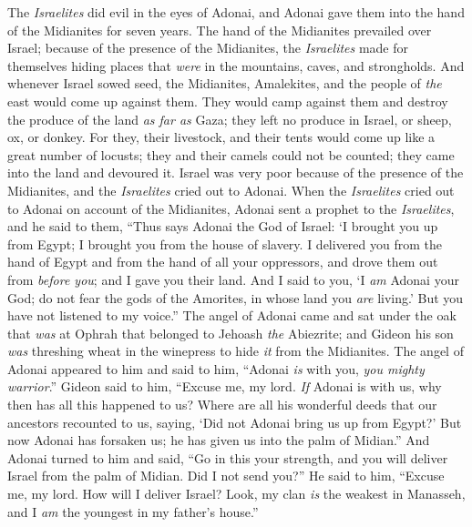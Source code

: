 \begin{biblechapter} %
 The \textit{Israelites} did evil in the eyes of Adonai, and Adonai gave them into the hand of the Midianites for seven years.
\verse The hand of the Midianites prevailed over Israel; because of the presence of the Midianites, the \textit{Israelites} made for themselves hiding places that \textit{were} in the mountains, caves, and strongholds.
\verse And whenever Israel sowed seed, the Midianites, Amalekites, and the people of \textit{the} east would come up against them.
\verse They would camp against them and destroy the produce of the land \textit{as far as} Gaza; they left no produce in Israel, or sheep, ox, or donkey.
\verse For they, their livestock, and their tents would come up like a great number of locusts; they and their camels could not be counted; they came into the land and devoured it.
\verse Israel was very poor because of the presence of the Midianites, and the \textit{Israelites} cried out to Adonai.
\verse When the \textit{Israelites} cried out to Adonai on account of the Midianites,
\verse Adonai sent a prophet to the \textit{Israelites}, and he said to them, “Thus says Adonai the God of Israel: ‘I brought you up from Egypt; I brought you from the house of slavery.
\verse I delivered you from the hand of Egypt and from the hand of all your oppressors, and drove them out from \textit{before you}; and I gave you their land.
\verse And I said to you, ‘I \textit{am} Adonai your God; do not fear the gods of the Amorites, in whose land you \textit{are} living.’ But you have not listened to my voice.”
 The angel of Adonai came and sat under the oak that \textit{was} at Ophrah that belonged to Jehoash \textit{the} Abiezrite; and Gideon his son \textit{was} threshing wheat in the winepress to hide \textit{it} from the Midianites.
\verse The angel of Adonai appeared to him and said to him, “Adonai \textit{is} with you, \textit{you mighty warrior}.”
\verse Gideon said to him, “Excuse me, my lord. \textit{If} Adonai is with us, why then has all this happened to us? Where are all his wonderful deeds that our ancestors recounted to us, saying, ‘Did not Adonai bring us up from Egypt?’ But now Adonai has forsaken us; he has given us into the palm of Midian.”
\verse And Adonai turned to him and said, “Go in this your strength, and you will deliver Israel from the palm of Midian. Did I not send you?”
\verse He said to him, “Excuse me, my lord. How will I deliver Israel? Look, my clan \textit{is} the weakest in Manasseh, and I \textit{am} the youngest in my father’s house.”

\end{biblechapter}
